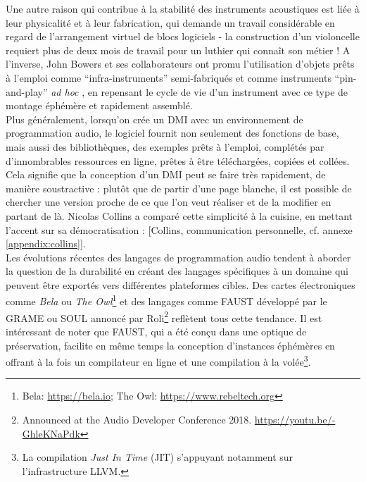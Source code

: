 \noindent Une autre raison qui contribue à la stabilité des instruments acoustiques est liée à leur physicalité et à leur fabrication, qui demande un travail considérable en regard de l'arrangement virtuel de blocs logiciels - la construction d'un violoncelle requiert plus de deux mois de travail pour un luthier qui connaît son métier ! A l'inverse, John Bowers et ses collaborateurs ont promu l'utilisation d'objets prêts à l'emploi comme ``infra-instruments'' semi-fabriqués \cite{bowers_not_2005} et comme instruments ``pin-and-play'' \textit{ad hoc} \cite{bowers_creating_2006}, en repensant le cycle de vie d'un instrument avec ce type de montage éphémère et rapidement assemblé.\\
\indent Plus généralement, lorsqu'on crée un \gls{DMI} avec un environnement de programmation audio, le logiciel fournit non seulement des fonctions de base, mais aussi des bibliothèques, des exemples prêts à l'emploi, complétés par d'innombrables ressources en ligne, prêtes à être téléchargées, copiées et collées.\\
\indent Cela signifie que la conception d'un \gls{DMI} peut se faire très rapidement, de manière soustractive : plutôt que de partir d'une page blanche, il est possible de chercher une version proche de ce que l'on veut réaliser et de la modifier en partant de là. Nicolas Collins a comparé cette simplicité à la cuisine, en mettant l'accent sur sa démocratisation :  [Collins, communication personnelle, cf. annexe \ref{appendix:collins}].\\
\indent Les évolutions récentes des langages de programmation audio tendent à aborder la question de la durabilité en créant des langages spécifiques à un domaine qui peuvent être exportés vers différentes plateformes cibles. Des cartes électroniques comme \textit{Bela} ou \textit{The Owl}\footnote{Bela: \url{https://bela.io}; The Owl: \url{https://www.rebeltech.org}} et des langages comme \gls{FAUST} développé par le \gls{GRAME} \cite{orlarey_faust_2008} ou SOUL annoncé par Roli\footnote{Announced at the Audio Developer Conference 2018. \url{https://youtu.be/-GhleKNaPdk}} reflètent tous cette tendance. Il est intéressant de noter que \gls{FAUST}, qui a été conçu dans une optique de préservation, facilite en même temps la conception d'instances éphémères en offrant à la fois un compilateur en ligne et une compilation à la volée\footnote{La compilation \textit{Just In Time} (JIT) s'appuyant notamment sur l'infrastructure \gls{LLVM}.}.
	

